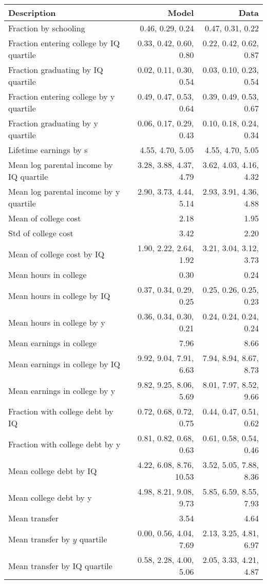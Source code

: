 \begin{tabular}{lrr}
\hline
Description & Model  & Data  \\
\hline
Fraction by schooling & 0.46, 0.29, 0.24  & 0.47, 0.31, 0.22  \\
Fraction entering college by IQ quartile & 0.33, 0.42, 0.60, 0.80  & 0.22, 0.42, 0.62, 0.87  \\
Fraction graduating by IQ quartile & 0.02, 0.11, 0.30, 0.54  & 0.03, 0.10, 0.23, 0.54  \\
Fraction entering college by y quartile & 0.49, 0.47, 0.53, 0.64  & 0.39, 0.49, 0.53, 0.67  \\
Fraction graduating by y quartile & 0.06, 0.17, 0.29, 0.43  & 0.10, 0.18, 0.24, 0.34  \\
Lifetime earnings by s & 4.55, 4.70, 5.05  & 4.55, 4.70, 5.05  \\
Mean log parental income by IQ quartile & 3.28, 3.88, 4.37, 4.79  & 3.62, 4.03, 4.16, 4.32  \\
Mean log parental income by y quartile & 2.90, 3.73, 4.44, 5.14  & 2.93, 3.91, 4.36, 4.88  \\
Mean of college cost & 2.18  & 1.95  \\
Std of college cost & 3.42  & 2.20  \\
Mean of college cost by IQ & 1.90, 2.22, 2.64, 1.92  & 3.21, 3.04, 3.12, 3.73  \\
Mean hours in college & 0.30  & 0.24  \\
Mean hours in college by IQ & 0.37, 0.34, 0.29, 0.25  & 0.25, 0.26, 0.25, 0.23  \\
Mean hours in college by y & 0.36, 0.34, 0.30, 0.21  & 0.24, 0.24, 0.24, 0.24  \\
Mean earnings in college & 7.96  & 8.66  \\
Mean earnings in college by IQ & 9.92, 9.04, 7.91, 6.63  & 7.94, 8.94, 8.67, 8.73  \\
Mean earnings in college by y & 9.82, 9.25, 8.06, 5.69  & 8.01, 7.97, 8.52, 9.66  \\
Fraction with college debt by IQ & 0.72, 0.68, 0.72, 0.75  & 0.44, 0.47, 0.51, 0.62  \\
Fraction with college debt by y & 0.81, 0.82, 0.68, 0.63  & 0.61, 0.58, 0.54, 0.46  \\
Mean college debt by IQ & 4.22, 6.08, 8.76, 10.53  & 3.52, 5.05, 7.88, 8.36  \\
Mean college debt by y & 4.98, 8.21, 9.08, 9.73  & 5.85, 6.59, 8.55, 7.93  \\
Mean transfer & 3.54  & 4.64  \\
Mean transfer by $y$ quartile & 0.00, 0.56, 4.04, 7.69  & 2.13, 3.25, 4.81, 6.97  \\
Mean transfer by IQ quartile & 0.58, 2.28, 4.00, 5.06  & 2.05, 3.33, 4.21, 4.87  \\
\hline
\end{tabular}%
